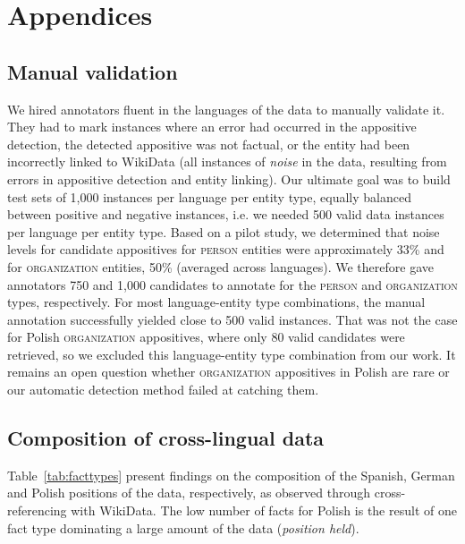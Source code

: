 \documentclass[11pt]{article}
\begin{document}



\clearpage
\appendix

\section{Appendices}

\subsection{Manual validation} 
\label{manual}
We hired annotators fluent in the languages of the data to manually validate it. They had to mark instances where an error had occurred in the appositive detection, the detected appositive was not factual, or the entity had been incorrectly linked to WikiData (all instances of \textit{noise} in the data, resulting from errors in appositive detection and entity linking). Our ultimate goal was to build test sets of 1,000 instances per language per entity type, equally balanced between positive and negative instances, i.e. we needed 500 valid data instances per language per entity type. Based on a pilot study, we determined that noise levels for candidate appositives for \textsc{person} entities were approximately 33\% and for \textsc{organization} entities, 50\% (averaged across languages). We therefore gave annotators 750 and 1,000 candidates to annotate for the \textsc{person} and \textsc{organization} types, respectively. For most language-entity type combinations, the manual annotation successfully yielded close to 500 valid instances. That was not the case for Polish \textsc{organization} appositives, where only 80 valid candidates were retrieved, so we excluded this language-entity type combination from our work. It remains an open question whether \textsc{organization} appositives in Polish are rare or our automatic detection method failed at catching them. 

\subsection{Composition of cross-lingual data}
\label{composition}
Table~\ref{tab:facttypes} present findings on the composition of the Spanish, German and Polish positions of the data, respectively, as observed through cross-referencing with WikiData. The low number of facts for Polish is the result of one fact type dominating a large amount of the data (\textit{position held}).
\end{document}
